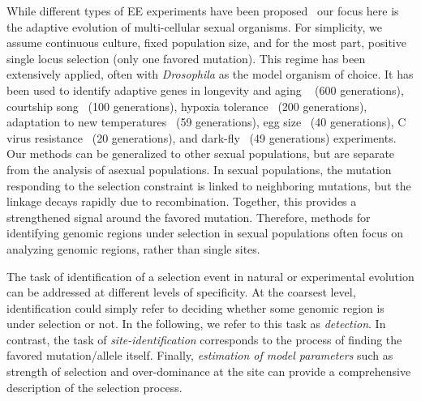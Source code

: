 While different types of EE experiments have been
proposed~\cite{Barrick2013Genome,schlotterer2015combining} our focus
here is the adaptive evolution of multi-cellular sexual organisms. For
simplicity, we assume continuous culture, fixed population size, and
for the most part, positive single locus selection (only one favored
mutation). This regime has been extensively applied, often with
\emph{Drosophila} as the model organism of choice. It has been used to
identify adaptive genes in longevity and aging
~\cite{burke2010genome,remolina2012genomic} (600 generations),
courtship song~\cite{turner2011population} (100 generations), hypoxia
tolerance~\cite{zhou2011experimental} (200 generations), adaptation to
new temperatures~\cite{orozco2012adaptation,tobler2014massive} (59
generations), egg size~\cite{jha2015whole} (40 generations), C virus
resistance~\cite{martins2014host} (20 generations), and
dark-fly~\cite{izutsu2015dynamics} (49 generations) experiments. Our
methods can be generalized to other sexual populations, but are
separate from the analysis of asexual populations. In sexual
populations, the mutation responding to the selection constraint is
linked to neighboring mutations, but the linkage decays rapidly due to
recombination. Together, this provides a strengthened signal around
the favored mutation. Therefore, methods for identifying genomic
regions under selection in sexual populations often focus on analyzing
genomic regions, rather than single sites.

The task of identification of a selection event in natural or
experimental evolution can be addressed at different levels of
specificity. At the coarsest level, identification could simply refer
to deciding whether some genomic region is under selection or not.  In
the following, we refer to this task as \emph{detection}. In contrast,
the task of \emph{site-identification} corresponds to the process of
finding the favored mutation/allele itself. Finally, \emph{estimation
  of model parameters} such as strength of selection and over-dominance
at the site can provide a comprehensive description of the selection
process.

